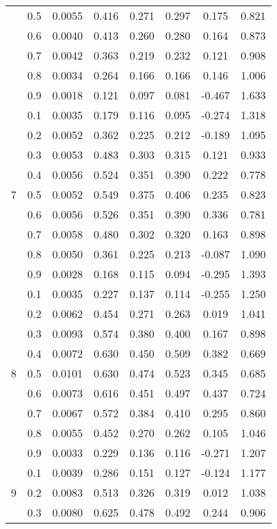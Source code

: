 \documentclass[11pt,a4paper]{report}
\begin{document}
\begin{longtable}{ | c | c || c | c | c | c | c | c | }
 & 0.5 & 0.0055 & 0.416 & 0.271 & 0.297 & 0.175 & 0.821 \\
 & 0.6 & 0.0040 & 0.413 & 0.260 & 0.280 & 0.164 & 0.873 \\
 & 0.7 & 0.0042 & 0.363 & 0.219 & 0.232 & 0.121 & 0.908 \\
 & 0.8 & 0.0034 & 0.264 & 0.166 & 0.166 & 0.146 & 1.006 \\
 & 0.9 & 0.0018 & 0.121 & 0.097 & 0.081 & -0.467 & 1.633 \\
 \hline
\multirow{9}{*}{7} & 0.1 & 0.0035 & 0.179 & 0.116 & 0.095 & -0.274 & 1.318 \\
 & 0.2 & 0.0052 & 0.362 & 0.225 & 0.212 & -0.189 & 1.095 \\
 & 0.3 & 0.0053 & 0.483 & 0.303 & 0.315 & 0.121 & 0.933 \\
 & 0.4 & 0.0056 & 0.524 & 0.351 & 0.390 & 0.222 & 0.778 \\
 & 0.5 & 0.0052 & 0.549 & 0.375 & 0.406 & 0.235 & 0.823 \\
 & 0.6 & 0.0056 & 0.526 & 0.351 & 0.390 & 0.336 & 0.781 \\
 & 0.7 & 0.0058 & 0.480 & 0.302 & 0.320 & 0.163 & 0.898 \\
 & 0.8 & 0.0050 & 0.361 & 0.225 & 0.213 & -0.087 & 1.090 \\
 & 0.9 & 0.0028 & 0.168 & 0.115 & 0.094 & -0.295 & 1.393 \\
 \hline
\multirow{9}{*}{8} & 0.1 & 0.0035 & 0.227 & 0.137 & 0.114 & -0.255 & 1.250 \\
 & 0.2 & 0.0062 & 0.454 & 0.271 & 0.263 & 0.019 & 1.041 \\
 & 0.3 & 0.0093 & 0.574 & 0.380 & 0.400 & 0.167 & 0.898 \\
 & 0.4 & 0.0072 & 0.630 & 0.450 & 0.509 & 0.382 & 0.669 \\
 & 0.5 & 0.0101 & 0.630 & 0.474 & 0.523 & 0.345 & 0.685 \\
 & 0.6 & 0.0073 & 0.616 & 0.451 & 0.497 & 0.437 & 0.724 \\
 & 0.7 & 0.0067 & 0.572 & 0.384 & 0.410 & 0.295 & 0.860 \\
 & 0.8 & 0.0055 & 0.452 & 0.270 & 0.262 & 0.105 & 1.046 \\
 & 0.9 & 0.0033 & 0.229 & 0.136 & 0.116 & -0.271 & 1.207 \\
 \hline
\multirow{9}{*}{9} & 0.1 & 0.0039 & 0.286 & 0.151 & 0.127 & -0.124 & 1.177 \\
 & 0.2 & 0.0083 & 0.513 & 0.326 & 0.319 & 0.012 & 1.038 \\
 & 0.3 & 0.0080 & 0.625 & 0.478 & 0.492 & 0.244 & 0.906 \\

\end{longtable}
\end{document}
